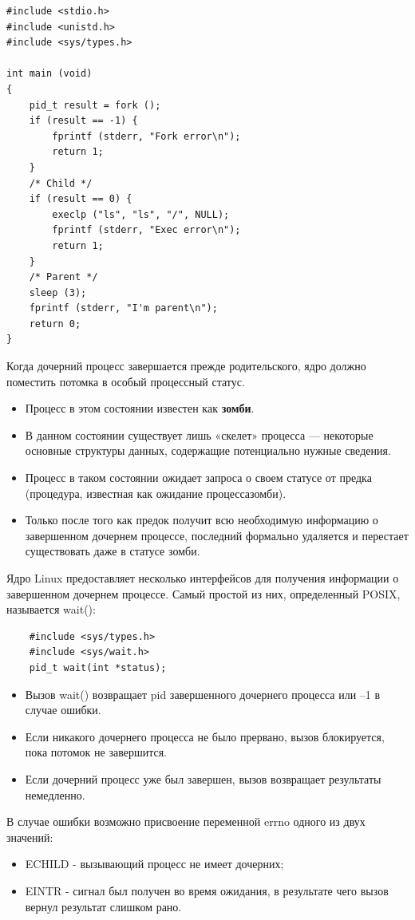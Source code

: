 \documentclass[xcolor=table]{beamer}
\begin{document}
\begin{frame}
	\begin{verbatim}
#include <stdio.h>
#include <unistd.h>
#include <sys/types.h>

int main (void)
{
    pid_t result = fork ();
    if (result == -1) {
        fprintf (stderr, "Fork error\n");
        return 1;
    }
    /* Child */
    if (result == 0) {
        execlp ("ls", "ls", "/", NULL);
        fprintf (stderr, "Exec error\n");
        return 1;
    }    
    /* Parent */
    sleep (3);    
    fprintf (stderr, "I'm parent\n");    
    return 0;
}
	\end{verbatim}
\end{frame}

\begin{frame}
	Когда дочерний процесс завершается прежде родительского, ядро должно поместить потомка в особый процессный статус. 
	\begin{itemize}
		\item Процесс в этом состоянии известен как \textbf{зомби}. 
		\item В данном состоянии существует лишь «скелет» процесса — некоторые основные структуры данных, содержащие потенциально нужные 	сведения. 
		\item Процесс в таком состоянии ожидает запроса о своем статусе от предка (процедура, известная как ожидание процесса­зомби). 
		\item Только после того как предок получит всю необходимую информацию о завершенном дочернем процессе, последний формально удаляется и перестает существовать даже в статусе зомби.
	\end{itemize}
\end{frame}

\begin{frame}[fragile]
Ядро Linux предоставляет несколько интерфейсов для получения информации о завершенном дочернем процессе. Самый простой из них, определенный POSIX, называется wait(): 
	\begin{verbatim}
	#include <sys/types.h>
	#include <sys/wait.h>	
	pid_t wait(int *status);
	\end{verbatim}
	\begin{itemize}
		\item Вызов wait() возвращает pid завершенного дочернего процесса или –1 в случае ошибки. 
		\item Если никакого дочернего процесса не было прервано, вызов блокируется, пока потомок не завершится. 
		\item Если дочерний процесс уже был завершен, вызов возвращает результаты немедленно. 
	\end{itemize}
	В случае ошибки возможно присвоение переменной errno одного из двух значений:
	\begin{itemize}
		\item ECHILD - вызывающий процесс не имеет дочерних;
		\item EINTR - сигнал был получен во время ожидания, в результате чего вызов вернул результат слишком рано.
	\end{itemize}
\end{frame}
\end{document}

